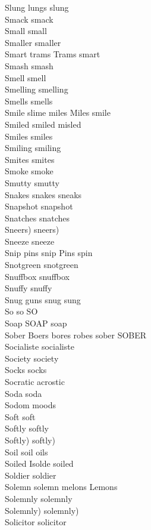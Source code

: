 Slung lungs slung\\
Smack smack\\
Small small\\
Smaller smaller\\
Smart trams Trams smart\\
Smash smash\\
Smell smell\\
Smelling smelling\\
Smells smells\\
Smile slime miles Miles smile\\
Smiled smiled misled\\
Smiles smiles\\
Smiling smiling\\
Smites smites\\
Smoke smoke\\
Smutty smutty\\
Snakes snakes sneaks\\
Snapshot snapshot\\
Snatches snatches\\
Sneers) sneers)\\
Sneeze sneeze\\
Snip pins snip Pins spin\\
Snotgreen snotgreen\\
Snuffbox snuffbox\\
Snuffy snuffy\\
Snug guns snug sung\\
So so SO\\
Soap SOAP soap\\
Sober Boers bores robes sober SOBER\\
Socialiste socialiste\\
Society society\\
Socks socks\\
Socratic acrostic\\
Soda soda\\
Sodom moods\\
Soft soft\\
Softly softly\\
Softly) softly)\\
Soil soil oils\\
Soiled Isolde soiled\\
Soldier soldier\\
Solemn solemn melons Lemons\\
Solemnly solemnly\\
Solemnly) solemnly)\\
Solicitor solicitor\\
